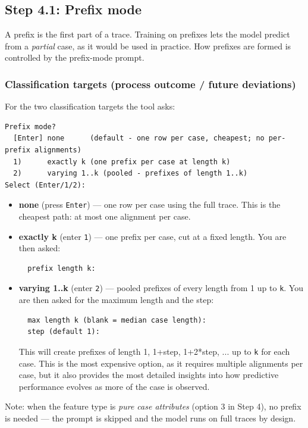 \documentclass[12pt,a4paper]{article}
\begin{document}
\subsection{Step 4.1: Prefix mode}
A prefix is the first part of a trace. Training on prefixes lets the model predict from a \emph{partial} case, as it would be used in practice. How prefixes are formed is controlled by the prefix-mode prompt.

\subsubsection{Classification targets (process outcome / future deviations)}
For the two classification targets the tool asks:
\begin{verbatim}
Prefix mode?
  [Enter] none      (default - one row per case, cheapest; no per-prefix alignments)
  1)      exactly k (one prefix per case at length k)
  2)      varying 1..k (pooled - prefixes of length 1..k)
Select (Enter/1/2):
\end{verbatim}
\begin{itemize}
    \item \textbf{none} (press \texttt{Enter}) --- one row per case using the full trace. This is the cheapest path: at most one alignment per case.
    \item \textbf{exactly k} (enter \texttt{1}) --- one prefix per case, cut at a fixed length. You are then asked:
    \begin{verbatim}
  prefix length k:
    \end{verbatim}
    \item \textbf{varying 1..k} (enter \texttt{2}) --- pooled prefixes of every length from 1 up to \texttt{k}. You are then asked for the maximum length and the step:
    \begin{verbatim}
  max length k (blank = median case length):
  step (default 1):
    \end{verbatim}
    This will create prefixes of length 1, 1+step, 1+2*step, ... up to \texttt{k} for each case. This is the most expensive option, as it requires multiple alignments per case, but it also provides the most detailed insights into how predictive performance evolves as more of the case is observed.
\end{itemize}
Note: when the feature type is \emph{pure case attributes} (option 3 in Step 4), no prefix is needed --- the prompt is skipped and the model runs on full traces by design.
\end{document}
